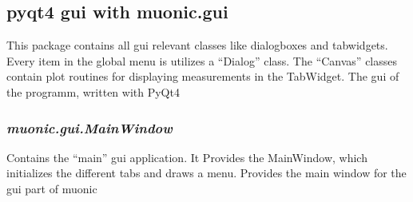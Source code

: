 \documentclass[letterpaper,10pt,english]{sphinxmanual}
\begin{document}
\subsection{pyqt4 gui with muonic.gui}
\label{muonic:pyqt4-gui-with-muonic-gui}
This package contains all gui relevant classes like dialogboxes and tabwidgets. Every item in the global menu is utilizes a ``Dialog'' class. The ``Canvas'' classes contain plot routines for displaying measurements in the TabWidget.
\label{muonic:module-muonic.gui}
The gui of the programm, written with PyQt4


\subsubsection{\emph{muonic.gui.MainWindow}}
\label{muonic:muonic-gui-mainwindow}
Contains the  ``main'' gui application. It Provides the MainWindow, which initializes the different tabs and draws a menu.
\label{muonic:module-muonic.gui.MainWindow}
Provides the main window for the gui part of muonic
\end{document}
